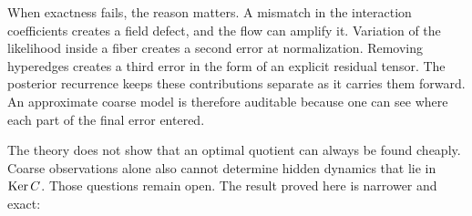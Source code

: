 When exactness fails, the reason matters.  A mismatch in the interaction coefficients creates a field defect, and the flow can amplify it.  Variation of the likelihood inside a fiber creates a second error at normalization.  Removing hyperedges creates a third error in the form of an explicit residual tensor.  The posterior recurrence keeps these contributions separate as it carries them forward.  An approximate coarse model is therefore auditable because one can see where each part of the final error entered.

The theory does not show that an optimal quotient can always be found cheaply.  Coarse observations alone also cannot determine hidden dynamics that lie in $\operatorname{Ker} C$.  Those questions remain open.  The result proved here is narrower and exact:
\begin{center}
\end{center}

